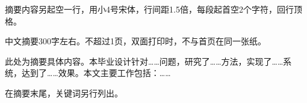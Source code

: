 \begin{cnabstract}
    摘要内容另起空一行，用小4号宋体，行间距1.5倍，每段起首空2个字符，回行顶格。

    中文摘要300字左右。不超过1页，双面打印时，不与首页在同一张纸。

    此处为摘要具体内容。本毕业设计针对……问题，研究了……方法，实现了……系统，达到了……效果。本文主要工作包括：……

    在摘要末尾，关键词另行列出。

\end{cnabstract}
